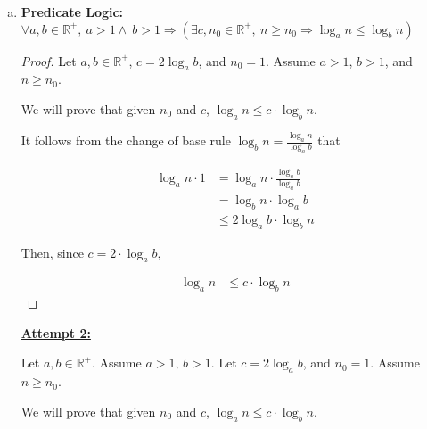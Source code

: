 \documentclass[12pt]{article}
\begin{document}
\begin{enumerate}[a.]
\begin{itemize}
    \end{itemize}

    \item

    \textbf{Predicate Logic:} $\forall a,b \in \mathbb{R}^{+},\:a > 1 \land \:b > 1
    \Rightarrow (\exists c, n_0 \in \mathbb{R}^{+},\:n \geq n_0 \Rightarrow \log_a n \leq \log_b n)$

    \begin{proof}

        Let $a,b \in \mathbb{R}^{+}$, $c = 2 \log_a b$, and $n_0 = 1$. Assume $a > 1$,
        $b > 1$, and $n \geq n_0$.

        \bigskip

        We will prove that given $n_0$ and $c$, $\log_a n \leq c \cdot \log_b n$.

        \bigskip

        It follows from the change of base rule $\log_b n = \frac{\log_a n}{\log_a b}$
        that

        \setcounter{equation}{0}
        \begin{align}
            \log_a n \cdot 1 &= \log_a n \cdot \frac{\log_a b}{\log_a b}\\
            &= \log_b n \cdot \log_a b\\
            &\leq 2 \log_a b \cdot \log_b n
        \end{align}

        \bigskip

        Then, since $c = 2 \cdot \log_a b$,

        \begin{align}
            \log_a n &\leq c \cdot \log_b n
        \end{align}

    \end{proof}

    \bigskip

    \begin{mdframed}
        \underline{\textbf{Attempt 2:}}

        \bigskip

        Let $a,b \in \mathbb{R}^{+}$. \color{red} Assume $a > 1$, $b > 1$.
        Let $c = 2 \log_a b$, and $n_0 = 1$. Assume $n \geq n_0$\color{black}.

        \bigskip

        We will prove that given $n_0$ and $c$, $\log_a n \leq c \cdot \log_b n$.

        \bigskip


\end{mdframed}
\end{enumerate}
\end{document}
